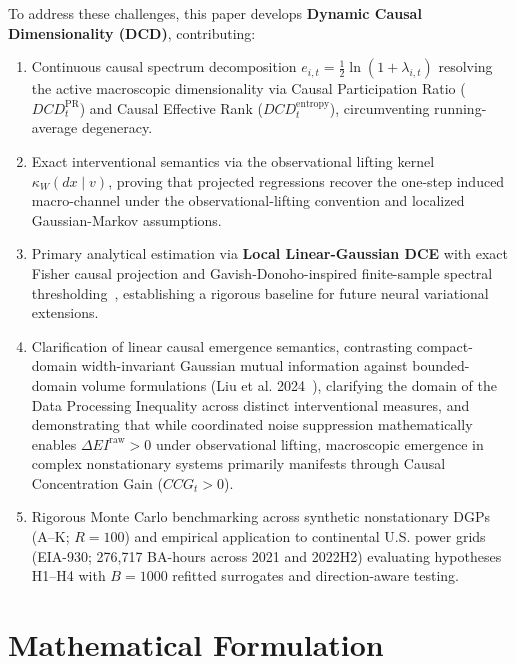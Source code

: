 \documentclass[10pt,twocolumn,journal]{article}
\begin{document}
To address these challenges, this paper develops \textbf{Dynamic Causal Dimensionality (DCD)}, contributing:
\begin{enumerate}
    \item Continuous causal spectrum decomposition $e_{i,t} = \frac{1}{2}\ln(1 + \lambda_{i,t})$ resolving the active macroscopic dimensionality via Causal Participation Ratio ($DCD_t^{\text{PR}}$) and Causal Effective Rank ($DCD_t^{\text{entropy}}$), circumventing running-average degeneracy.
    \item Exact interventional semantics via the observational lifting kernel $\kappa_W(dx \mid v)$, proving that projected regressions recover the one-step induced macro-channel under the observational-lifting convention and localized Gaussian-Markov assumptions.
    \item Primary analytical estimation via \textbf{Local Linear-Gaussian DCE} with exact Fisher causal projection and Gavish-Donoho-inspired finite-sample spectral thresholding~\cite{gavish2014optimal,ledoit2004well}, establishing a rigorous baseline for future neural variational extensions.
    \item Clarification of linear causal emergence semantics, contrasting compact-domain width-invariant Gaussian mutual information against bounded-domain volume formulations (Liu et al. 2024~\cite{liu2024exact,liu2025singular}), clarifying the domain of the Data Processing Inequality across distinct interventional measures, and demonstrating that while coordinated noise suppression mathematically enables $\Delta EI^{\text{raw}} > 0$ under observational lifting, macroscopic emergence in complex nonstationary systems primarily manifests through Causal Concentration Gain ($CCG_t > 0$).
    \item Rigorous Monte Carlo benchmarking across synthetic nonstationary DGPs (A--K; $R=100$) and empirical application to continental U.S. power grids (EIA-930; 276,717 BA-hours across 2021 and 2022H2) evaluating hypotheses H1--H4 with $B=1000$ refitted surrogates and direction-aware testing.
\end{enumerate}

\section{Mathematical Formulation}
\end{document}
